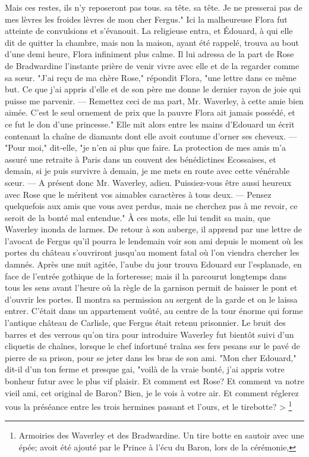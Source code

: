 {Mais ces restes, ils n'y reposeront pas tous. sa tête. sa tête.
Je ne presserai pas de mes lèvres les froides lèvres de mon cher Fergus."
Ici la malheureuse Flora fut atteinte de convulsions et s'évanouit. La religieuse entra, et Édouard, à qui elle dit de quitter la chambre, mais non la maison, ayant été rappelé, trouva au bout d'une\setcounter{page}{382} demi heure, Flora infiniment plus calme.
Il lui adressa de la part de Rose de Bradwardine l'instante prière de venir vivre avec elle et de la regarder comme sa sœur.
"J'ai reçu de ma chère Rose," répondit Flora, "une lettre dans ce même but. Ce que j'ai appris d'elle et de son père me donne le dernier rayon de joie qui puisse me parvenir. — Remettez ceci de ma part, Mr. Waverley, à cette amie bien aimée. C'est le seul ornement de prix que la pauvre Flora ait jamais possédé, et ce fut le don d'une princesse." Elle mit alors entre les mains d'Edouard un écrit contenant la chaîne de diamants dont elle avoit coutume d'orner ses cheveux. — "Pour moi," dit-elle, "je n'en ai plus que faire. La protection de mes amis m'a assuré une retraite à Paris dans un couvent des bénédictines Ecossaises, et demain, si je puis survivre à demain, je me mets en route avec cette vénérable sœur. — A présent donc Mr. Waverley, adieu. Puissiez-vous être aussi heureux avec Rose que le méritent vos aimables caractères à tous deux. — Pensez quelquefois aux amis que vous avez perdus, mais ne cherchez pas à me revoir, ce seroit de la bonté mal entendue."\setcounter{page}{383} À ces mots, elle lui tendit sa main, que Waverley inonda de larmes. De retour à son auberge, il apprend par une lettre de l'avocat de Fergus qu'il pourra le lendemain voir son ami depuis le moment où les portes du château s'ouvriront jusqu'au moment fatal où l'on viendra chercher les damnés.
Après une nuit agitée, l'aube du jour trouva Edouard sur l'esplanade, en face de l'entrée gothique de la forteresse; mais il la parcourut longtemps dans tous les sens avant l'heure où la règle de la garnison permit de baisser le pont et d'ouvrir les portes.
Il montra sa permission au sergent de la garde et on le laissa entrer. C'était dans un appartement voûté, au centre de la tour énorme qui forme l'antique château de Carlisle, que Fergus était retenu prisonnier. Le bruit des barres et des verrous qu'on tira pour introduire Waverley fut bientôt suivi d'un cliquetis de chaînes, lorsque le chef infortuné traîna ses fers pesans sur le pavé de pierre de sa prison, pour se jeter dans les bras de son ami.
"Mon cher Edouard," dit-il d'un ton ferme et presque gai, "voilà de la vraie bonté, j'ai appris votre bonheur futur avec\setcounter{page}{384} le plus vif plaisir. Et comment est Rose? Et comment va notre vieil ami, cet original de Baron? Bien, je le vois à votre air. Et comment réglerez vous la préséance entre les trois hermines passant et l'ours, et le tirebotte? > \footnote{Armoiries des Waverley et des Bradwardine. Un tire botte en sautoir avec une épée; avoit été ajouté par le Prince à l'écu du Baron, lors de la cérémonie,}
}
